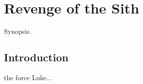 \chapter{Revenge of the Sith}
	\label{chapter:revenge-of-sith}%



\begin{synopsis}
	Synopsis.
\end{synopsis}


\section{Introduction}

 the force Luke...

